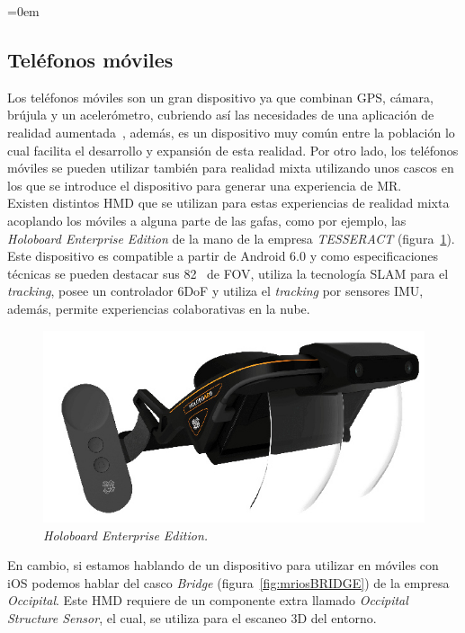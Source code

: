 \parindent=0em
\subsection{Teléfonos móviles}
\label{sec:telefonosMoviles}
\noindent


Los teléfonos móviles son un gran dispositivo ya que combinan GPS, cámara, brújula y un acelerómetro, cubriendo así las necesidades de una aplicación de realidad aumentada~\cite{arsmartphones}, además, es un dispositivo muy común entre la población lo cual facilita el desarrollo y expansión de esta realidad. Por otro lado, los teléfonos móviles se pueden utilizar también para realidad mixta utilizando unos cascos en los que se introduce el dispositivo para generar una experiencia de MR.\\

Existen distintos HMD que se utilizan para estas experiencias de realidad mixta acoplando los móviles a alguna parte de las gafas, como por ejemplo, las \textit{Holoboard Enterprise Edition} de la mano de la empresa \textit{TESSERACT} (figura~\ref{fig:mrandroidTESSERACT}). Este dispositivo es compatible a partir de Android 6.0  y como especificaciones técnicas se pueden destacar sus 82\degree~ de FOV, utiliza la tecnología SLAM para el \textit{tracking}, posee un controlador 6DoF y utiliza el \textit{tracking} por sensores IMU, además, permite experiencias colaborativas en la nube.

\begin{figure}[H]
    \centering
    \includegraphics[scale=0.3]{Images/Estado del arte/mrandroid.jpg}
    \caption[\textit{Holoboard Enterprise Edition}]{
    \textit{Holoboard Enterprise Edition\footnotemark.}
    }
    \label{fig:mrandroidTESSERACT}
\end{figure}
En cambio, si estamos hablando de un dispositivo para utilizar en móviles con iOS podemos hablar del casco \textit{Bridge} (figura~\ref{fig:mriosBRIDGE}) de la empresa \textit{Occipital}. Este HMD requiere de un componente extra llamado \textit{Occipital Structure Sensor}, el cual, se utiliza para el escaneo 3D del entorno.


